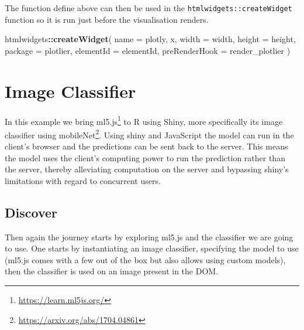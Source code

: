 \documentclass[
]{krantz}
\makeatletter
\newenvironment{Shaded}{\begin{snugshade}}{\end{snugshade}}
\newcommand{\ControlFlowTok}[1]{\textcolor[rgb]{0.27,0.27,0.27}{\textbf{#1}}}
\newcommand{\DataTypeTok}[1]{\textcolor[rgb]{0.27,0.27,0.27}{#1}}
\newcommand{\KeywordTok}[1]{\textcolor[rgb]{0.27,0.27,0.27}{\textbf{#1}}}
\newcommand{\NormalTok}[1]{#1}
\newcommand{\OperatorTok}[1]{\textcolor[rgb]{0.43,0.43,0.43}{\textbf{#1}}}
\newcommand{\OtherTok}[1]{\textcolor[rgb]{0.37,0.37,0.37}{#1}}
\newcommand{\StringTok}[1]{\textcolor[rgb]{0.5,0.5,0.5}{#1}}
\renewcommand{\href}[2]{#2\footnote{\url{#1}}}
\newenvironment{kframe}{%
\medskip{}
\setlength{\fboxsep}{.8em}
 \def\at@end@of@kframe{}%
 \ifinner\ifhmode%
  \def\at@end@of@kframe{\end{minipage}}%
  \begin{minipage}{\columnwidth}%
 \fi\fi%
 \def\FrameCommand##1{\hskip\@totalleftmargin \hskip-\fboxsep
 \colorbox{shadecolor}{##1}\hskip-\fboxsep
     \hskip-\linewidth \hskip-\@totalleftmargin \hskip\columnwidth}%
 \MakeFramed {\advance\hsize-\width
   \@totalleftmargin\z@ \linewidth\hsize
   \@setminipage}}%
 {\par\unskip\endMakeFramed%
 \at@end@of@kframe}
\renewenvironment{Shaded}{\begin{kframe}}{\end{kframe}}
\makeatother
\begin{document}
\begin{Shaded}
\end{Shaded}

The function define above can then be used in the \texttt{htmlwidgets::createWidget} function so it is run just before the visualisation renders.

\begin{Shaded}
\begin{Highlighting}[]
\NormalTok{htmlwidgets}\OperatorTok{::}\KeywordTok{createWidget}\NormalTok{(}
  \DataTypeTok{name =} \StringTok{\textquotesingle{}plotly\textquotesingle{}}\NormalTok{,}
\NormalTok{  x,}
  \DataTypeTok{width =}\NormalTok{ width,}
  \DataTypeTok{height =}\NormalTok{ height,}
  \DataTypeTok{package =} \StringTok{\textquotesingle{}plotlier\textquotesingle{}}\NormalTok{,}
  \DataTypeTok{elementId =}\NormalTok{ elementId,}
  \DataTypeTok{preRenderHook =}\NormalTok{ render\_plotlier}
\NormalTok{)}
\end{Highlighting}
\end{Shaded}

\hypertarget{image-classifier}{%
\chapter{Image Classifier}\label{image-classifier}}

In this example we bring \href{https://learn.ml5js.org/}{ml5.js} to R using Shiny, more specifically its image classifier using \href{https://arxiv.org/abs/1704.04861}{mobileNet}. Using shiny and JavaScript the model can run in the client's browser and the predictions can be sent back to the server. This means the model uses the client's computing power to run the prediction rather than the server, thereby alleviating computation on the server and bypassing shiny's limitations with regard to concurrent users.

\hypertarget{discover}{%
\section{Discover}\label{discover}}

Then again the journey starts by exploring ml5.js and the classifier we are going to use. One starts by instantiating an image classifier, specifying the model to use (ml5.js comes with a few out of the box but also allows using custom models), then the classifier is used on an image present in the DOM.
\end{document}
